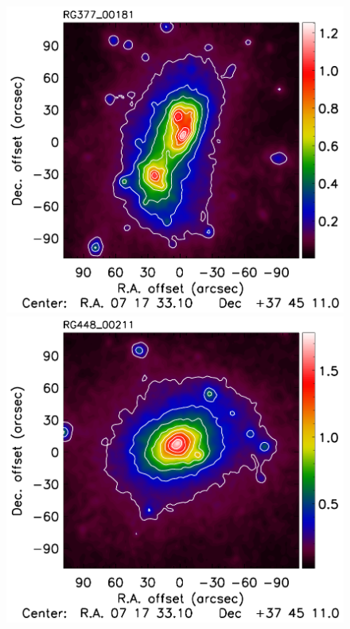 \documentclass[twocolumn,traditabstract]{aa}
\begin{document}
\begin{figure}[h]
\includegraphics[trim=0cm 0.7cm 0cm 0cm, clip=true, totalheight=3.6cm]{Figure/Map_RG377_00181_DMmap_zproj_zobs0p5_raw.pdf}
\includegraphics[trim=0cm 0.7cm 0cm 0cm, clip=true, totalheight=3.6cm]{Figure/Map_RG448_00211_DMmap_zproj_zobs0p4_raw.pdf}

\end{figure}
\end{document}
